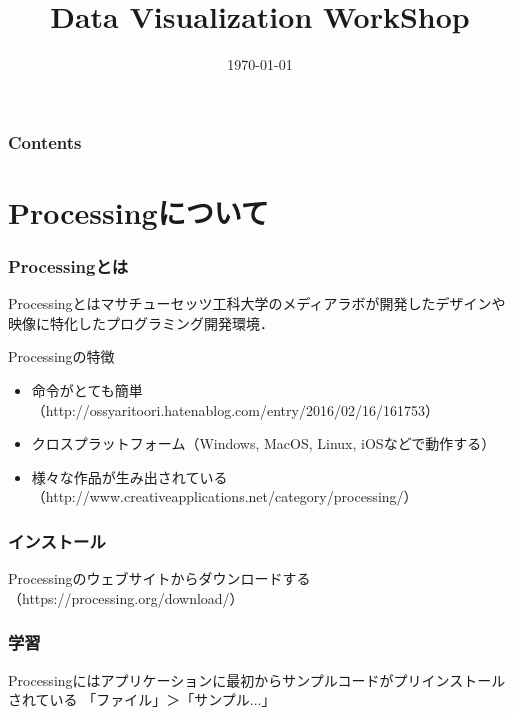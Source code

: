 \documentclass[10pt, dvipdfmx]{beamer}
\title{Data Visualization WorkShop}
\author{}
\institute[所属]{}
\date{\today}
\begin{document}
    \begin{frame}[plain]
        \frametitle{}
	    \titlepage
    \end{frame}

    \begin{frame}
        \frametitle{Contents}
        \tableofcontents
    \end{frame}

    \section{Processingについて}
        \begin{frame}
            \frametitle{Processingとは}
            Processingとはマサチューセッツ工科大学のメディアラボが開発したデザインや映像に特化したプログラミング開発環境．
            \begin{block}{Processingの特徴}
                \begin{itemize}
                    \item 命令がとても簡単（http://ossyaritoori.hatenablog.com/entry/2016/02/16/161753）
                    \item クロスプラットフォーム（Windows, MacOS, Linux, iOSなどで動作する）
                    \item 様々な作品が生み出されている（http://www.creativeapplications.net/category/processing/）
                \end{itemize}
            \end{block}
        \end{frame}

        \begin{frame}
            \frametitle{インストール}
            Processingのウェブサイトからダウンロードする（https://processing.org/download/）
        \end{frame}

        \begin{frame}
            \frametitle{学習}
            Processingにはアプリケーションに最初からサンプルコードがプリインストールされている
            「ファイル」＞「サンプル...」
        \end{frame}
\end{document}
